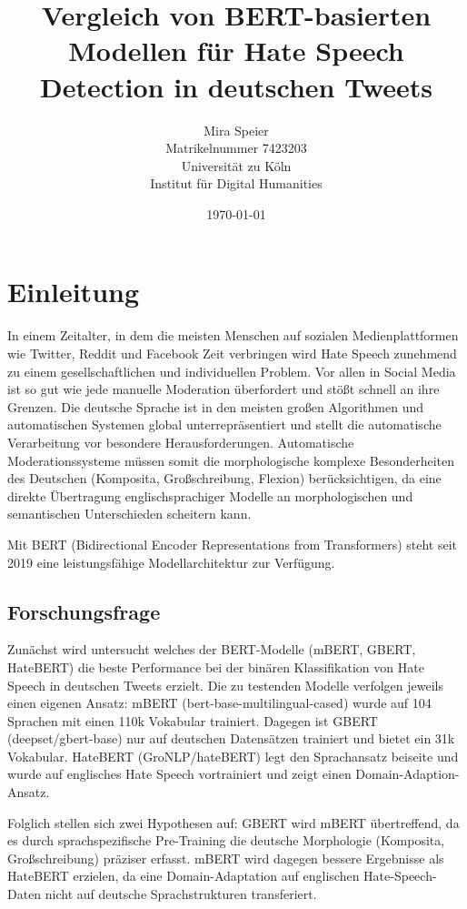 ﻿\documentclass[11pt,a4paper]{article}
\title{\textbf{Vergleich von BERT-basierten Modellen für Hate Speech Detection in deutschen Tweets}}
\author{Mira Speier\\
\small Matrikelnummer 7423203\\
\small Universität zu Köln\\
\small Institut für Digital Humanities}
\date{\today}
\begin{document}
\maketitle
\thispagestyle{empty}

\clearpage

\tableofcontents
\clearpage

\setcounter{page}{1}


\section{Einleitung}
In einem Zeitalter, in dem die meisten Menschen auf sozialen Medienplattformen wie Twitter, Reddit und Facebook Zeit verbringen wird Hate Speech  zunehmend zu einem gesellschaftlichen und individuellen Problem. Vor allen in Social Media ist so gut wie jede manuelle Moderation überfordert und stößt schnell an ihre Grenzen. Die deutsche Sprache ist in den meisten großen Algorithmen und automatischen Systemen global unterrepräsentiert und stellt die automatische Verarbeitung vor besondere Herausforderungen. Automatische Moderationssysteme müssen somit die morphologische komplexe Besonderheiten des Deutschen (Komposita, Großschreibung, Flexion) berücksichtigen, da eine direkte Übertragung englischsprachiger Modelle an morphologischen und semantischen Unterschieden scheitern kann.

Mit BERT (Bidirectional Encoder Representations from Transformers) \parencite{devlin2019} steht seit 2019 eine leistungsfähige Modellarchitektur zur Verfügung.


\subsection*{Forschungsfrage}

Zunächst wird untersucht welches der BERT-Modelle (mBERT, GBERT, HateBERT) die beste Performance bei der binären Klassifikation von Hate Speech in deutschen Tweets erzielt. Die zu testenden Modelle verfolgen jeweils einen eigenen Ansatz: mBERT (bert-base-multilingual-cased) wurde auf 104 Sprachen mit einen 110k Vokabular trainiert. Dagegen ist GBERT (deepset/gbert-base) nur auf deutschen Datensätzen trainiert und bietet ein 31k Vokabular. HateBERT (GroNLP/hateBERT) legt den Sprachansatz beiseite und wurde auf englisches Hate Speech vortrainiert und zeigt einen Domain-Adaption-Ansatz. 

Folglich stellen sich zwei Hypothesen auf: GBERT wird mBERT übertreffend, da es durch sprachspezifische Pre-Training die deutsche Morphologie (Komposita, Großschreibung) präziser erfasst.
mBERT wird dagegen bessere Ergebnisse als HateBERT erzielen, da eine Domain-Adaptation auf englischen Hate-Speech-Daten nicht auf deutsche Sprachstrukturen transferiert.
\end{document}
